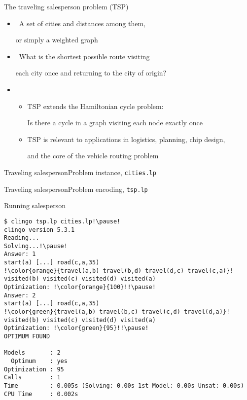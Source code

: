 \begin{frame}[c]{The traveling salesperson problem (TSP)}
  \begin{itemize}
  \item {} \ A set of cities and distances among them,

    or simply a weighted graph
    \smallskip
  \item {} \ What is the shortest possible route visiting

    each city once and returning to the city of origin?
    \bigskip
  \item<2-> 
    \begin{itemize}
    \item TSP extends the Hamiltonian cycle problem:
      \par
      Is there a cycle in a graph visiting each node exactly once
      \smallskip
    \item TSP is relevant to applications in logistics, planning, chip design,

      and the core of the vehicle routing problem
    \end{itemize}
  \end{itemize}
\end{frame}
\begin{frame}[fragile]{Traveling salesperson}{Problem instance, \texttt{cities.lp}}

\end{frame}
\begin{frame}[fragile]{Traveling salesperson}{Problem encoding, \texttt{tsp.lp}}

%
\end{frame}
\begin{frame}{Running salesperson}
\begin{lstlisting}[escapechar=!]
$ clingo tsp.lp cities.lp!\pause!
clingo version 5.3.1
Reading...
Solving...!\pause!
Answer: 1
start(a) [...] road(c,a,35)
!\color{orange}{travel(a,b) travel(b,d) travel(d,c) travel(c,a)}!
visited(b) visited(c) visited(d) visited(a)
Optimization: !\color{orange}{100}!!\pause!
Answer: 2
start(a) [...] road(c,a,35)
!\color{green}{travel(a,b) travel(b,c) travel(c,d) travel(d,a)}!
visited(b) visited(c) visited(d) visited(a)
Optimization: !\color{green}{95}!!\pause!
OPTIMUM FOUND

Models       : 2
  Optimum    : yes
Optimization : 95
Calls        : 1
Time         : 0.005s (Solving: 0.00s 1st Model: 0.00s Unsat: 0.00s)
CPU Time     : 0.002s
\end{lstlisting}
\end{frame}
